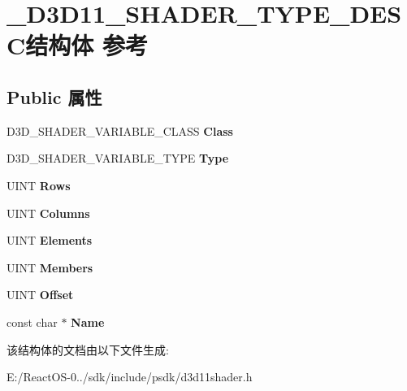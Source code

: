 \hypertarget{struct___d3_d11___s_h_a_d_e_r___t_y_p_e___d_e_s_c}{}\section{\+\_\+\+D3\+D11\+\_\+\+S\+H\+A\+D\+E\+R\+\_\+\+T\+Y\+P\+E\+\_\+\+D\+E\+S\+C结构体 参考}
\label{struct___d3_d11___s_h_a_d_e_r___t_y_p_e___d_e_s_c}
\subsection*{Public 属性}
\begin{DoxyCompactItemize}
\item 
\mbox{\label{struct___d3_d11___s_h_a_d_e_r___t_y_p_e___d_e_s_c_a1062bd28fadb89d4887c56aaeb41a4a6}} 
D3\+D\+\_\+\+S\+H\+A\+D\+E\+R\+\_\+\+V\+A\+R\+I\+A\+B\+L\+E\+\_\+\+C\+L\+A\+SS {\bfseries Class}
\item 
\mbox{\label{struct___d3_d11___s_h_a_d_e_r___t_y_p_e___d_e_s_c_a2f7ab2f1ab691c70f030475eb308277d}} 
D3\+D\+\_\+\+S\+H\+A\+D\+E\+R\+\_\+\+V\+A\+R\+I\+A\+B\+L\+E\+\_\+\+T\+Y\+PE {\bfseries Type}
\item 
\mbox{\label{struct___d3_d11___s_h_a_d_e_r___t_y_p_e___d_e_s_c_a7465c4732b60bdee285e35c1afd39e2a}} 
U\+I\+NT {\bfseries Rows}
\item 
\mbox{\label{struct___d3_d11___s_h_a_d_e_r___t_y_p_e___d_e_s_c_a8d997ac025033358f10658b2427fe822}} 
U\+I\+NT {\bfseries Columns}
\item 
\mbox{\label{struct___d3_d11___s_h_a_d_e_r___t_y_p_e___d_e_s_c_a713a3b30dc935e759c8f492265fb9ba1}} 
U\+I\+NT {\bfseries Elements}
\item 
\mbox{\label{struct___d3_d11___s_h_a_d_e_r___t_y_p_e___d_e_s_c_af2556ca4589066d7c036619270f6a5f8}} 
U\+I\+NT {\bfseries Members}
\item 
\mbox{\label{struct___d3_d11___s_h_a_d_e_r___t_y_p_e___d_e_s_c_ad890b05e626c071c55516277c73dafe2}} 
U\+I\+NT {\bfseries Offset}
\item 
\mbox{\label{struct___d3_d11___s_h_a_d_e_r___t_y_p_e___d_e_s_c_ab9a094349fea7d5099b68bd5d479007a}} 
const char $\ast$ {\bfseries Name}
\end{DoxyCompactItemize}


该结构体的文档由以下文件生成\+:\begin{DoxyCompactItemize}
\item 
E\+:/\+React\+O\+S-\/0../sdk/include/psdk/d3d11shader.\+h\end{DoxyCompactItemize}
